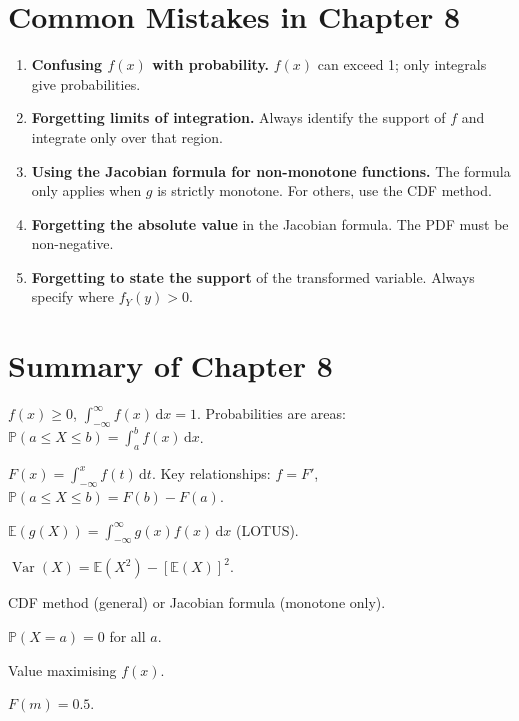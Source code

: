 \documentclass[12pt, a4paper, oneside]{book}
\theoremstyle{definition}
\theoremstyle{plain}
\theoremstyle{remark}
\newcommand{\E}{\mathbb{E}}
\newcommand{\Var}{\operatorname{Var}}
\newcommand{\Prob}{\mathbb{P}}
\begin{document}
\section{Common Mistakes in Chapter 8}

\begin{warningbox}
\begin{enumerate}[label=\textbf{\arabic*.}]
  \item \textbf{Confusing $f(x)$ with probability.}  $f(x)$ can exceed 1;
        only integrals give probabilities.
  \item \textbf{Forgetting limits of integration.}  Always identify the
        support of $f$ and integrate only over that region.
  \item \textbf{Using the Jacobian formula for non-monotone functions.}
        The formula only applies when $g$ is strictly monotone.  For others,
        use the CDF method.
  \item \textbf{Forgetting the absolute value} in the Jacobian formula.
        The PDF must be non-negative.
  \item \textbf{Forgetting to state the support} of the transformed variable.
        Always specify where $f_Y(y) > 0$.
\end{enumerate}
\end{warningbox}

\section{Summary of Chapter 8}

\begin{summarybox}
\begin{description}[style=nextline]
  \item[PDF] $f(x)\ge 0$, $\int_{-\infty}^\infty f(x)\,\mathrm{d}x=1$.
    Probabilities are areas: $\Prob(a\le X\le b)=\int_a^b f(x)\,\mathrm{d}x$.
  \item[CDF] $F(x)=\int_{-\infty}^x f(t)\,\mathrm{d}t$.
    Key relationships: $f=F'$, $\Prob(a\le X\le b)=F(b)-F(a)$.
  \item[Expectation] $\E(g(X))=\int_{-\infty}^\infty g(x)f(x)\,\mathrm{d}x$ (LOTUS).
  \item[Variance] $\Var(X)=\E(X^2)-[\E(X)]^2$.
  \item[Transformations] CDF method (general) or Jacobian formula (monotone only).
  \item[Key property] $\Prob(X=a)=0$ for all $a$.
  \item[Mode] Value maximising $f(x)$.
  \item[Median $m$] $F(m)=0.5$.
\end{description}
\end{summarybox}
\end{document}

